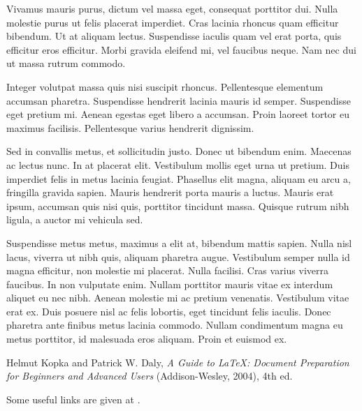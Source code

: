 \documentclass[aps,11pt, twocolumn]{revtex4-1}
\begin{document}
Vivamus mauris purus, dictum vel massa eget, consequat porttitor dui. Nulla molestie purus ut felis placerat imperdiet. Cras lacinia rhoncus quam efficitur bibendum. Ut at aliquam lectus. Suspendisse iaculis quam vel erat porta, quis efficitur eros efficitur. Morbi gravida eleifend mi, vel faucibus neque. Nam nec dui ut massa rutrum commodo.

Integer volutpat massa quis nisi suscipit rhoncus. Pellentesque elementum accumsan pharetra. Suspendisse hendrerit lacinia mauris id semper. Suspendisse eget pretium mi. Aenean egestas eget libero a accumsan. Proin laoreet tortor eu maximus facilisis. Pellentesque varius hendrerit dignissim.

Sed in convallis metus, et sollicitudin justo. Donec ut bibendum enim. Maecenas ac lectus nunc. In at placerat elit. Vestibulum mollis eget urna ut pretium. Duis imperdiet felis in metus lacinia feugiat. Phasellus elit magna, aliquam eu arcu a, fringilla gravida sapien. Mauris hendrerit porta mauris a luctus. Mauris erat ipsum, accumsan quis nisi quis, porttitor tincidunt massa. Quisque rutrum nibh ligula, a auctor mi vehicula sed.

Suspendisse metus metus, maximus a elit at, bibendum mattis sapien. Nulla nisl lacus, viverra ut nibh quis, aliquam pharetra augue. Vestibulum semper nulla id magna efficitur, non molestie mi placerat. Nulla facilisi. Cras varius viverra faucibus. In non vulputate enim. Nullam porttitor mauris vitae ex interdum aliquet eu nec nibh. Aenean molestie mi ac pretium venenatis. Vestibulum vitae erat ex. Duis posuere nisl ac felis lobortis, eget tincidunt felis iaculis. Donec pharetra ante finibus metus lacinia commodo. Nullam condimentum magna eu metus porttitor, id malesuada eros aliquam. Proin et euismod ex.

\begin{thebibliography}{5}

Helmut Kopka and Patrick W. Daly, \textsl{A Guide to
\LaTeX: Document Preparation for Beginners and Advanced Users} (Addison-Wesley, 2004), 4th ed.

Some useful links are
given at \url{}.

\end{thebibliography}
\end{document}

